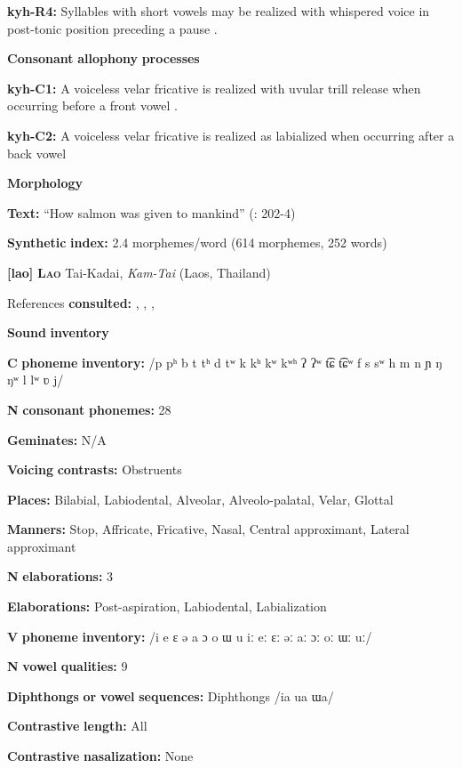 \begin{styleBody}
\textbf{kyh-R4:} Syllables with short vowels may be realized with whispered voice in post-tonic position preceding a pause \citep[13]{Bright1957}.

\textbf{Consonant} \textbf{allophony} \textbf{processes}

\textbf{kyh-C1:} A voiceless velar fricative is realized with uvular trill release when occurring before a front vowel \citep{Bright1957}.

\textbf{kyh-C2:} A voiceless velar fricative is realized as labialized when occurring after a back vowel \citep[8]{Bright1957}

\textbf{Morphology}

\textbf{Text:} “How salmon was given to mankind” (\citealt{AnguloFreeland1971}: 202-4)

\textbf{Synthetic} \textbf{index:} 2.4 morphemes/word (614 morphemes, 252 words)

\textbf{[lao]}   \textbf{\textsc{Lao}}  Tai-Kadai, \textit{Kam-Tai} (Laos, Thailand)

References \textbf{consulted:} \citet{Enfield2004}, \citet{Enfield2007}, \citet{Erickson2001}, \citet{MorevEtAl1979}

\textbf{Sound} \textbf{inventory}

\textbf{C} \textbf{phoneme} \textbf{inventory:} /p pʰ b t tʰ d tʷ k kʰ kʷ kʷʰ ʔ ʔʷ t͡ɕ t͡ɕʷ f s sʷ h m n ɲ ŋ ŋʷ l lʷ ʋ j/

\textbf{N} \textbf{consonant} \textbf{phonemes:} 28

\textbf{Geminates:} N/A

\textbf{Voicing} \textbf{contrasts:} Obstruents

\textbf{Places:} Bilabial, Labiodental, Alveolar, Alveolo-palatal, Velar, Glottal

\textbf{Manners:} Stop, Affricate, Fricative, Nasal, Central approximant, Lateral approximant

\textbf{N} \textbf{elaborations:} 3

\textbf{Elaborations:} Post-aspiration, Labiodental, Labialization

\textbf{V} \textbf{phoneme} \textbf{inventory:} /i e ɛ ə a ɔ o ɯ u iː eː ɛː əː aː ɔː oː ɯː uː/

\textbf{N} \textbf{vowel} \textbf{qualities:} 9

\textbf{Diphthongs} \textbf{or} \textbf{vowel} \textbf{sequences:} Diphthongs /ia ua ɯa/

\textbf{Contrastive} \textbf{length:} All

\textbf{Contrastive} \textbf{nasalization:} None


\end{styleBody}
